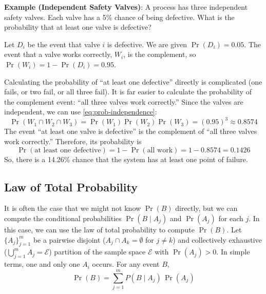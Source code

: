 \begin{exampleBox}
    \textbf{Example (Independent Safety Valves)}: A process has three independent safety valves. Each valve has a 5\% chance of being defective. What is the probability that at least one valve is defective?

    Let $D_i$ be the event that valve $i$ is defective. We are given $\Pr(D_i) = 0.05$. The event that a valve works correctly, $W_i$, is the complement, so $\Pr(W_i) = 1 - \Pr(D_i) = 0.95$.

    Calculating the probability of ``at least one defective'' directly is complicated (one fails, or two fail, or all three fail). It is far easier to calculate the probability of the complement event: ``all three valves work correctly.'' Since the valves are independent, we can use \autoref{eq:prob-independence}:
    \begin{equation}
        \Pr(W_1 \cap W_2 \cap W_3) = \Pr(W_1)\Pr(W_2)\Pr(W_3) = (0.95)^3 \approx 0.8574
    \end{equation}
    The event ``at least one valve is defective'' is the complement of ``all three valves work correctly.'' Therefore, its probability is
    \begin{equation}
        \Pr(\text{at least one defective}) = 1 - \Pr(\text{all work}) = 1 - 0.8574 = 0.1426
    \end{equation}
    So, there is a 14.26\% chance that the system has at least one point of failure.
\end{exampleBox}

\subsection{Law of Total Probability}
It is often the case that we might not know $\Pr(B)$ directly, but we can compute the conditional probabilities $\Pr(B \mid A_j)$ and $\Pr(A_j)$ for each $j$. In this case, we can use the law of total probability to compute $\Pr(B)$. Let $\{A_j\}_{j=1}^m$ be a pairwise disjoint ($A_j \cap A_k = \emptyset$ for $j\neq k$) and collectively exhaustive ($\bigcup_{j=1}^m A_j = \mathcal{E}$) partition of the sample space $\mathcal{E}$ with $\Pr(A_j)>0$. In simple terms, one and only one $A_i$ occurs. For any event $B$,
\begin{equation}
    \Pr(B) = \sum_{j=1}^m P\!\left(B \mid A_j\right)\,\Pr(A_j)
    \label{eq:ltp-events}
\end{equation}


